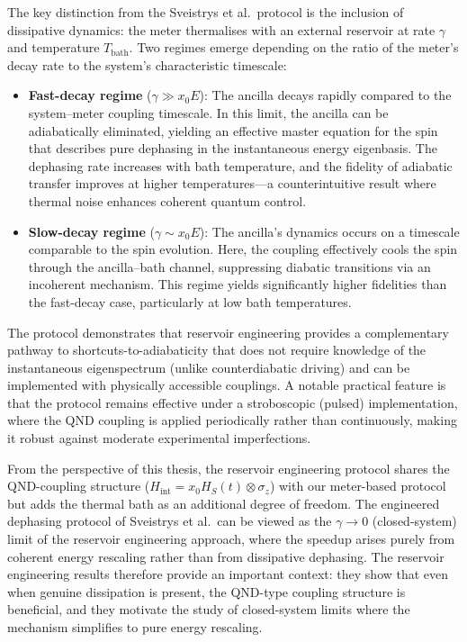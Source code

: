 \qquad The key distinction from the Sveistrys et al.~protocol\cite{DephasingPaper} is the inclusion of dissipative dynamics: the meter thermalises with an external reservoir at rate $\gamma$ and temperature $T_{\text{bath}}$. Two regimes emerge depending on the ratio of the meter's decay rate to the system's characteristic timescale:
\begin{itemize}
    \item \textbf{Fast-decay regime} ($\gamma \gg x_0 E$): The ancilla decays rapidly compared to the system--meter coupling timescale. In this limit, the ancilla can be adiabatically eliminated, yielding an effective master equation for the spin that describes pure dephasing in the instantaneous energy eigenbasis. The dephasing rate increases with bath temperature, and the fidelity of adiabatic transfer improves at higher temperatures---a counterintuitive result where thermal noise enhances coherent quantum control.
    \item \textbf{Slow-decay regime} ($\gamma \sim x_0 E$): The ancilla's dynamics occurs on a timescale comparable to the spin evolution. Here, the coupling effectively cools the spin through the ancilla--bath channel, suppressing diabatic transitions via an incoherent mechanism. This regime yields significantly higher fidelities than the fast-decay case, particularly at low bath temperatures.
\end{itemize}

\qquad The protocol demonstrates that reservoir engineering provides a complementary pathway to shortcuts-to-adiabaticity that does not require knowledge of the instantaneous eigenspectrum (unlike counterdiabatic driving) and can be implemented with physically accessible couplings. A notable practical feature is that the protocol remains effective under a stroboscopic (pulsed) implementation, where the QND coupling is applied periodically rather than continuously, making it robust against moderate experimental imperfections.

\qquad From the perspective of this thesis, the reservoir engineering protocol shares the QND-coupling structure ($H_{\text{int}} = x_0 H_S(t) \otimes \sigma_z$) with our meter-based protocol but adds the thermal bath as an additional degree of freedom. The engineered dephasing protocol of Sveistrys et al.~can be viewed as the $\gamma \to 0$ (closed-system) limit of the reservoir engineering approach, where the speedup arises purely from coherent energy rescaling rather than from dissipative dephasing. The reservoir engineering results therefore provide an important context: they show that even when genuine dissipation is present, the QND-type coupling structure is beneficial, and they motivate the study of closed-system limits where the mechanism simplifies to pure energy rescaling.

